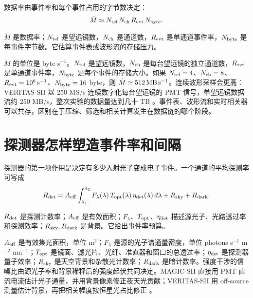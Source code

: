 数据率由事件率和每个事件占用的字节数决定：
\begin{equation}
  \dot{M}
  \simeq
  N_{\rm tel}\,N_{\rm ch}\,R_{\rm evt}\,N_{\rm byte}.
  \label{eq:ch06-data-rate}
\end{equation}
\begin{formulaexplain}
\(\dot M\) 是数据率；\(N_{\rm tel}\) 是望远镜数，\(N_{\rm ch}\) 是通道数，\(R_{\rm evt}\) 是单通道事件率，\(N_{\rm byte}\) 是每事件字节数。它估算事件表或波形流的存储压力。
\end{formulaexplain}
\(\dot M\) 的单位是 byte s\(^{-1}\)。\(N_{\rm tel}\) 是望远镜数，\(N_{\rm ch}\) 是每台望远镜的独立通道数，\(R_{\rm evt}\) 是单通道事件率，\(N_{\rm byte}\) 是每个事件的存储大小。如果 \(N_{\rm tel}=4\)、\(N_{\rm ch}=8\)、\(R_{\rm evt}=10^6\,{\rm s^{-1}}\)、\(N_{\rm byte}=16\) byte，则 \(\dot M\simeq512\,{\rm MB\,s^{-1}}\)。连续波形采样会更高：VERITAS-SII 以 250 MS/s 连续数字化每台望远镜的 PMT 信号，单望远镜数据流约 250 MB/s，整次实验的数据量达到几十 TB \citep{2020NatAs...4.1164A}。事件表、波形流和实时相关器可以共存，区别在于压缩、筛选和相关计算发生在数据链的哪个阶段。

\section{探测器怎样塑造事件率和间隔}

探测器的第一项作用是决定有多少入射光子变成电子事件。一个通道的平均探测率可写成
\begin{equation}
  R_{\rm det}
  =
  A_{\rm eff}
  \int_{\lambda_1}^{\lambda_2}
  F_\lambda(\lambda)\,
  T_{\rm opt}(\lambda)\,
  \eta_{\rm det}(\lambda)\,
  d\lambda
  +R_{\rm sky}+R_{\rm dark}.
  \label{eq:ch06-detected-rate}
\end{equation}
\begin{formulaexplain}
\(R_{\rm det}\) 是探测计数率；\(A_{\rm eff}\) 是有效面积；\(F_\lambda\)、\(T_{\rm opt}\)、\(\eta_{\rm det}\) 描述源光子、光路透过率和探测效率；\(R_{\rm sky},R_{\rm dark}\) 是背景。它给出事件率预算。
\end{formulaexplain}
\(A_{\rm eff}\) 是有效集光面积，单位 m\(^2\)；\(F_\lambda\) 是源的光子谱通量密度，单位 photons s\(^{-1}\) m\(^{-2}\) nm\(^{-1}\)；\(T_{\rm opt}\) 是镜面、滤光片、光纤、准直器和窗口的总透过率；\(\eta_{\rm det}\) 是探测器量子效率；\(R_{\rm sky}\) 是天空背景和杂散光计数率；\(R_{\rm dark}\) 是暗计数率。强度干涉的信噪比由源光子率和背景稀释后的强度起伏共同决定。MAGIC-SII 直接用 PMT 直流电流估计光子通量，并用背景像素修正夜天光贡献；VERITAS-SII 用 off-source 测量估计背景，再把相关幅度按恒星光占比修正 \citep{2020NatAs...4.1164A,2024MNRAS.529.4387A}。

